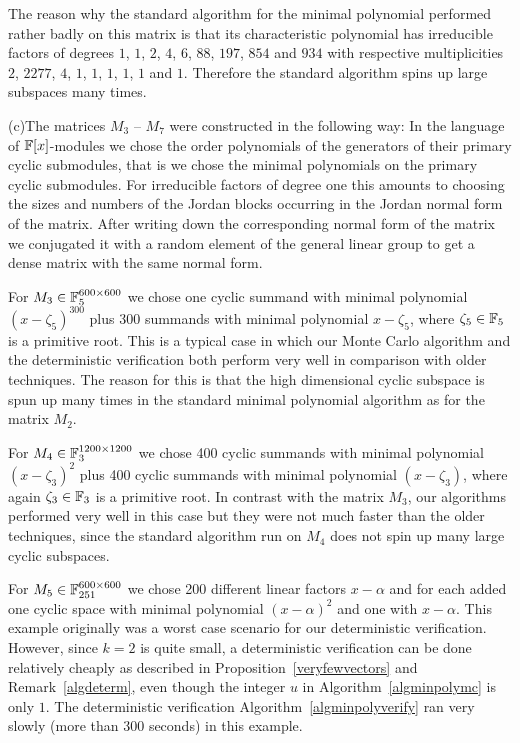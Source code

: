 The reason why the standard algorithm for the minimal polynomial
performed rather badly on this matrix is that its characteristic polynomial
has irreducible factors of degrees $1$, $1$, $2$, $4$, $6$, $88$,
$197$, $854$ and $934$ with respective multiplicities
$2$, $2277$, $4$, $1$, $1$, $1$, $1$, $1$ and $1$.
Therefore the standard algorithm spins up large subspaces
many times.

(c)\quad The matrices $M_3$ -- $M_7$ were constructed in the following way:
In the language of $\mathbb{F}[x]$-modules we chose the order polynomials of
the generators of their primary cyclic submodules, that is we chose the
minimal polynomials on the primary cyclic submodules. For irreducible factors
of degree one this amounts to choosing the sizes and numbers of the
Jordan blocks occurring in the Jordan normal form of the matrix.
After writing down the corresponding normal form of the matrix we
conjugated it with a random element of the general linear group to
get a dense matrix with the same normal form.

For $M_3 \in \mathbb{F}_5^{600 \times 600}$ we chose one cyclic summand with
minimal polynomial $(x-\zeta_5)^{300}$ plus 300 summands with minimal
polynomial $x-\zeta_5$, where $\zeta_5 \in \mathbb{F}_5$ is a primitive root.
This is a typical case in which our Monte Carlo algorithm and
the deterministic verification both perform very well in comparison
with older techniques. The reason for this is that the high dimensional
cyclic subspace is spun up many times in the standard minimal polynomial
algorithm as for the matrix $M_2$.

For $M_4 \in \mathbb{F}_3^{1200 \times 1200}$ we chose 400 cyclic summands with
minimal polynomial $(x-\zeta_3)^2$ plus 400 cyclic summands with
minimal polynomial $(x-\zeta_3)$, where again $\zeta_3 \in \mathbb{F}_3$ is
a primitive root. In contrast with the matrix $M_3$,  our algorithms 
performed very well in this case but they were not
much faster than the older techniques, since the standard algorithm
run on $M_4$ does not spin up many large cyclic subspaces.

For $M_5 \in \mathbb{F}_{251}^{600 \times 600}$ we chose 200 different linear
factors $x-\alpha$ and for each added one cyclic space with minimal polynomial
$(x-\alpha)^2$ and one with $x-\alpha$. This example originally was a
worst case scenario for our deterministic verification. However, since $k=2$ is 
quite small, a deterministic verification can be done relatively
cheaply as described in Proposition~\ref{veryfewvectors} and
Remark~\ref{algdeterm}, even though the integer $u$ in
Algorithm~\ref{algminpolymc} is only $1$. The deterministic
verification Algorithm~\ref{algminpolyverify} ran very slowly 
(more than 300 seconds) in this example.

